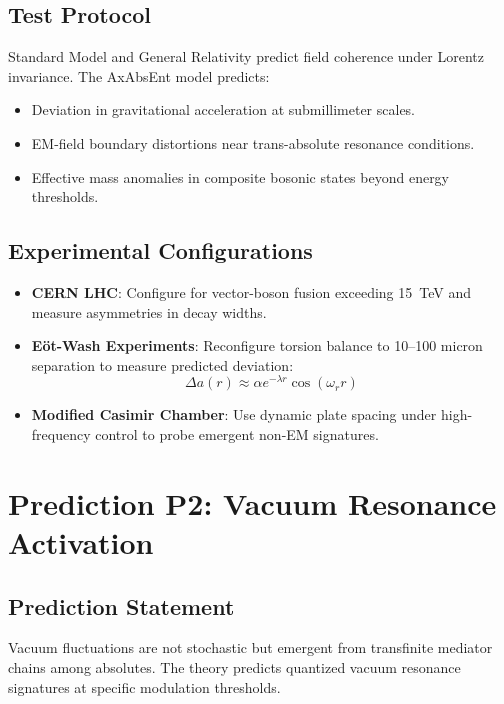 \documentclass[11pt]{article}
\begin{document}
\subsection{Test Protocol}

Standard Model and General Relativity predict field coherence under Lorentz invariance. The AxAbsEnt model predicts:

\begin{itemize}
    \item Deviation in gravitational acceleration at submillimeter scales.
    \item EM-field boundary distortions near trans-absolute resonance conditions.
    \item Effective mass anomalies in composite bosonic states beyond energy thresholds.
\end{itemize}

\subsection{Experimental Configurations}

\begin{itemize}
    \item \textbf{CERN LHC}: Configure for vector-boson fusion exceeding 15~TeV and measure asymmetries in decay widths.
    \item \textbf{Eöt-Wash Experiments}: Reconfigure torsion balance to 10–100 micron separation to measure predicted deviation:
    \[
    \Delta a(r) \approx \alpha e^{-\lambda r} \cos(\omega_r r)
    \]
    \item \textbf{Modified Casimir Chamber}: Use dynamic plate spacing under high-frequency control to probe emergent non-EM signatures.
\end{itemize}

\section{Prediction P2: Vacuum Resonance Activation}

\subsection{Prediction Statement}

Vacuum fluctuations are not stochastic but emergent from transfinite mediator chains among absolutes. The theory predicts quantized vacuum resonance signatures at specific modulation thresholds.
\end{document}
